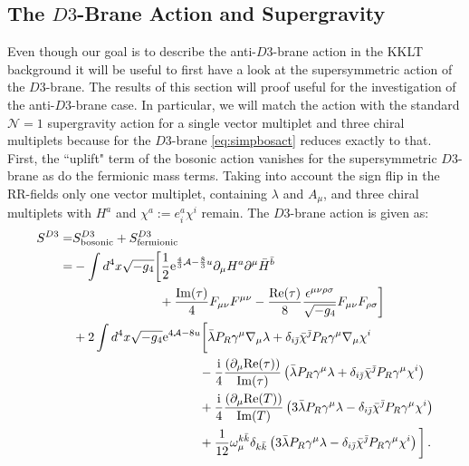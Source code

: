 \documentclass[12pt]{report}
\newcommand{\bea}{\begin{equation}\begin{aligned}}
\newcommand{\eea}{\end{aligned}\end{equation}}
\def\rmi{{\rm i}}
\def\rme{{\rm e}}
\def\jb{{\bar \jmath}}
\def\rmre{{\rm Re}}
\def\rmim{{\rm Im}}
\begin{document}
\subsection{The $D3$-Brane Action and Supergravity}
\label{sec:susyD3}
Even though our goal is to describe the anti-$D3$-brane action in the KKLT background it will be useful to first have a look at the supersymmetric action of the $D3$-brane. The results of this section will proof useful  for the investigation of the anti-$D3$-brane case. In particular, we will match the action with the standard $\mathcal{N}=1$ supergravity action for a single vector multiplet and three chiral multiplets because for the $D3$-brane \eqref{eq:simpbosact} reduces exactly to that. First, the ``uplift" term of the bosonic action vanishes for the supersymmetric $D3$-brane as do the fermionic mass terms. Taking into account the sign flip in the RR-fields only one vector multiplet, containing $\lambda$ and $A_\mu$, and three chiral multiplets with $H^a$ and $\chi^a := e^a_i \chi^i$ remain. The $D3$-brane action is given as:
\bea 
S^{D3}
=& S^{D3}_{\text{bosonic}} + S^{D3}_{\text{fermionic}}\\
=& - \int d^4x \sqrt{-g_4} \bigg[ \frac{1}{2} \rme^{\frac{4}{3} \mathcal{A}-\frac{8}{3}u}\partial_\mu H^a \partial^\mu \bar{H}^{\bar{b}}\\
&\qquad\qquad\qquad\;\;\; + \frac{\rmim(\tau)}{4} F_{\mu\nu}F^{\mu\nu} - \frac{\rmre(\tau)}{8} \frac{\epsilon^{\mu\nu\rho\sigma}}{\sqrt{-g_4}} F_{\mu\nu}F_{\rho\sigma}\bigg]\\
& + 2 \int d^4x \sqrt{-g_4} \rme^{4\mathcal{A}-8u} \bigg[ \bar{\lambda} P_R \gamma^\mu \nabla_\mu \lambda + \delta_{i\jb} \bar{\chi}^\jb P_R \gamma^\mu \nabla_\mu \chi^i\\
&\qquad\qquad\qquad\qquad\qquad - \frac{\rmi}{4} \frac{\left(\partial_\mu \rmre(\tau)\right)}{\rmim(\tau)} \left( \bar{\lambda} P_R \gamma^\mu \lambda + \delta_{i\jb} \bar{\chi}^\jb P_R \gamma^\mu \chi^i\right)\\
&\qquad\qquad\qquad\qquad\qquad + \frac{\rmi}{4} \frac{\left(\partial_\mu \rmre(T)\right)}{\rmim(T)} \left(3 \bar{\lambda} P_R \gamma^\mu \lambda - \delta_{i\jb} \bar{\chi}^\jb P_R \gamma^\mu \chi^i\right)\\
&\qquad\qquad\qquad\qquad\qquad + \frac{1}{12} \omega_\mu^{k\bar{k}} \delta_{k\bar{k}} \left(3 \bar{\lambda} P_R \gamma^\mu \lambda - \delta_{i\jb} \bar{\chi}^\jb P_R \gamma^\mu \chi^i\right)\bigg]\,.
\label{eq:d3act}
\eea
\end{document}
